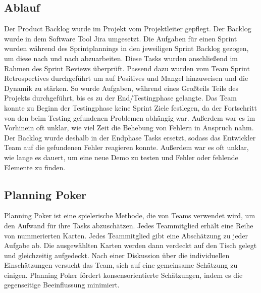 \subsection{Ablauf}\label{subsec:Ablauf}
Der Product Backlog wurde im Projekt vom Projektleiter gepflegt. Der Backlog wurde in dem Software Tool Jira umgesetzt.
Die Aufgaben für einen Sprint wurden während des Sprintplannings in den jeweiligen Sprint Backlog gezogen, um diese nach und nach abzuarbeiten.
Diese Tasks wurden anschließend im Rahmen des Sprint Reviews überprüft. Passend dazu wurden vom Team Sprint Retrospectives durchgeführt um auf Positives und Mangel hinzuweisen und die Dynamik zu stärken.
So wurde Aufgaben, während eines Großteils Teils des Projekts durchgeführt, bis es zu der End/Testingphase gelangte.
Das Team konnte zu Beginn der Testingphase keine Sprint Ziele festlegen, da der Fortschritt von den beim Testing gefundenen Problemen abhängig war. Außerdem war es im Vorhinein oft unklar, wie viel Zeit die Behebung von Fehlern in Anspruch nahm.
Der Backlog wurde deshalb in der Endphase Tasks ersetzt, sodass das Entwickler Team auf die gefundenen Fehler reagieren konnte.
Außerdem war es oft unklar, wie lange es dauert, um eine neue Demo zu testen und Fehler oder fehlende Elemente zu finden.

\subsection{Planning Poker}\label{subsec:Planning-Poker}
Planning Poker ist eine spielerische Methode, die von Teams verwendet wird, um den Aufwand für ihre Tasks abzuschätzen.
Jedes Teammitglied erhält eine Reihe von nummerierten Karten. Jedes Teammitglied gibt eine Abschätzung zu jeder Aufgabe ab.
Die ausgewählten Karten werden dann verdeckt auf den Tisch gelegt und gleichzeitig aufgedeckt.
Nach einer Diskussion über die individuellen Einschätzungen versucht das Team, sich auf eine gemeinsame Schätzung zu einigen.
Planning Poker fördert konsensorientierte Schätzungen, indem es die gegenseitige Beeinflussung minimiert. 

\renewcommand{\kapitelautor}{}